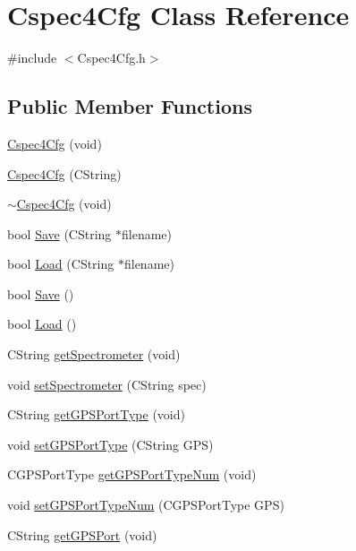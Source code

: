 \hypertarget{classCspec4Cfg}{
\section{Cspec4Cfg Class Reference}
\label{classCspec4Cfg}
}


{\ttfamily \#include $<$Cspec4Cfg.h$>$}

\subsection*{Public Member Functions}
\begin{DoxyCompactItemize}
\item 
\hyperlink{classCspec4Cfg_ad84525f5769b8fd5d4f7d81274746a09}{Cspec4Cfg} (void)
\item 
\hyperlink{classCspec4Cfg_aad116a454c8a16c07de396a7237062b2}{Cspec4Cfg} (CString)
\item 
\hyperlink{classCspec4Cfg_af48811299c12fec0f206267773b1c11a}{$\sim$Cspec4Cfg} (void)
\item 
bool \hyperlink{classCspec4Cfg_a2ea078015ba782798f6c82c2d9daea9b}{Save} (CString $\ast$filename)
\item 
bool \hyperlink{classCspec4Cfg_a64200b9d9d82339dff66f1e9290b48ce}{Load} (CString $\ast$filename)
\item 
bool \hyperlink{classCspec4Cfg_ab58399fa143d022a3122d6275b031a6f}{Save} ()
\item 
bool \hyperlink{classCspec4Cfg_a03e113e53e2436ea0bd45556e80ca715}{Load} ()
\item 
CString \hyperlink{classCspec4Cfg_a385c70f54008ab20cb4acdc51028b37c}{getSpectrometer} (void)
\item 
void \hyperlink{classCspec4Cfg_a2db131e1f9d43aeaee4d5d7f0380a577}{setSpectrometer} (CString spec)
\item 
CString \hyperlink{classCspec4Cfg_ad07b765fb0fc2648ed3524e70097bc2f}{getGPSPortType} (void)
\item 
void \hyperlink{classCspec4Cfg_a2f5c1621c77bf3805e5bf27cbc13c0f5}{setGPSPortType} (CString GPS)
\item 
CGPSPortType \hyperlink{classCspec4Cfg_a41aae26113edd08f7a7a027f8365dfd9}{getGPSPortTypeNum} (void)
\item 
void \hyperlink{classCspec4Cfg_a89ded6ffd13db3dcddca96f89cea6b49}{setGPSPortTypeNum} (CGPSPortType GPS)
\item 
CString \hyperlink{classCspec4Cfg_aced41d91c02aab0e05588657231daead}{getGPSPort} (void)
\item 

\end{DoxyCompactItemize}
